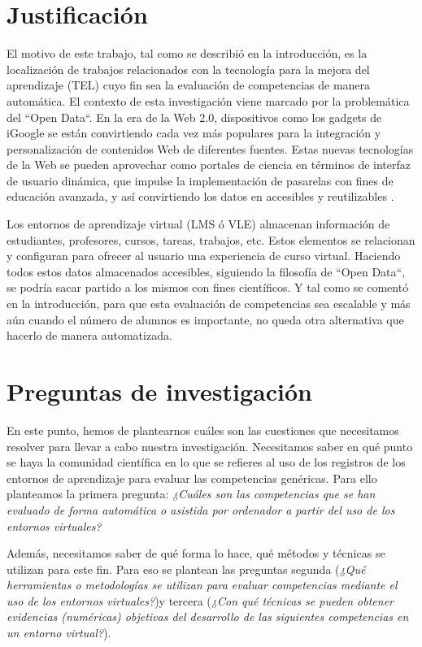 \section{Justificación}
El motivo de este trabajo, tal como se describió en la introducción, es la localización de trabajos relacionados con la tecnología para la mejora del aprendizaje (TEL) cuyo fin sea la evaluación de competencias de manera automática. El contexto de esta investigación viene marcado por la problemática del ``Open Data``. En la era de la Web 2.0, dispositivos como los gadgets de iGoogle se están convirtiendo cada vez más populares para la integración y personalización de contenidos Web de diferentes fuentes. Estas nuevas tecnologías de la Web se pueden aprovechar como portales de ciencia en términos de interfaz de usuario dinámica, que impulse la implementación de pasarelas con fines de educación avanzada, y así convirtiendo los datos en accesibles y reutilizables \cite{Wenjun:2008}.

Los entornos de aprendizaje virtual (LMS ó VLE) almacenan información de estudiantes, profesores, cursos, tareas, trabajos, etc. Estos elementos se relacionan y configuran para ofrecer al usuario una experiencia de curso virtual. Haciendo todos estos datos almacenados accesibles, siguiendo la filosofía de ``Open Data``, se podría sacar partido a los mismos con fines científicos. Y tal como se comentó en la introducción, para que esta evaluación de competencias sea escalable y más aún cuando el número de alumnos es importante, no queda otra alternativa que hacerlo de manera automatizada.


\section{Preguntas de investigación}

En este punto, hemos de plantearnos cuáles son las cuestiones que necesitamos resolver para llevar a cabo nuestra investigación. Necesitamos saber en qué punto se haya la comunidad científica en lo que se refieres al uso de los registros de los entornos de aprendizaje para evaluar las competencias genéricas. Para ello planteamos la primera pregunta: \emph{¿Cuáles son las competencias que se han evaluado de forma automática o asistida por ordenador a partir del uso de los entornos virtuales?}

Además, necesitamos saber de qué forma lo hace, qué métodos y técnicas se utilizan para este fin. Para eso se plantean las preguntas segunda (\emph{¿Qué herramientas o metodologías se utilizan para evaluar competencias mediante el uso de los entornos virtuales?})y tercera (\emph{¿Con qué técnicas se pueden obtener evidencias (numéricas) objetivas del desarrollo de las siguientes competencias en un entorno virtual?}).

